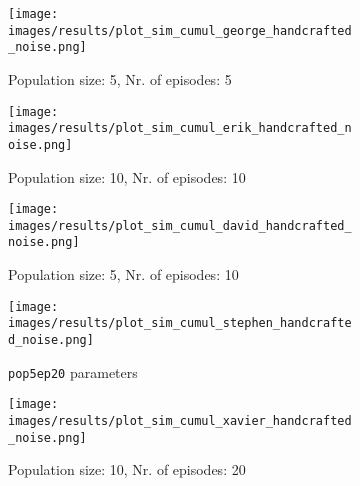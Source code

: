 
\begin{figure}[ht]
	\begin{subfigure}{0.48\linewidth}
	\texttt{[image: images/results/plot\_sim\_cumul\_george\_handcrafted\_noise.png]}
	\caption{Population size: 5, Nr. of episodes: 5}
	\label{fig:cumul_handcrafted_noise_george}
	\end{subfigure}
	\hfill
	\begin{subfigure}{0.48\linewidth}
		\texttt{[image: images/results/plot\_sim\_cumul\_erik\_handcrafted\_noise.png]}
	\caption{Population size: 10, Nr. of episodes: 10}
	\label{fig:cumul_handcrafted_noise_erik}
	\end{subfigure}
	\begin{subfigure}{0.48\linewidth}
	\texttt{[image: images/results/plot\_sim\_cumul\_david\_handcrafted\_noise.png]}
	\caption{Population size: 5, Nr. of episodes: 10}
	\label{fig:cumul_handcrafted_noise_david}
	\end{subfigure}
	\hfill
	\begin{subfigure}{0.48\linewidth}
	\texttt{[image: images/results/plot\_sim\_cumul\_stephen\_handcrafted\_noise.png]}
	\caption{\texttt{pop5ep20} parameters}
	\label{fig:cumul_handcrafted_noise_stephen}
	\end{subfigure}
	\begin{subfigure}{0.48\linewidth}
	\texttt{[image: images/results/plot\_sim\_cumul\_xavier\_handcrafted\_noise.png]}
	\caption{Population size: 10, Nr. of episodes: 20}
	\label{fig:cumul_handcrafted_noise_xavier}
	\end{subfigure}
	\hfill
	\begin{subfigure}{0.48\linewidth}

\end{subfigure}
\end{figure}
